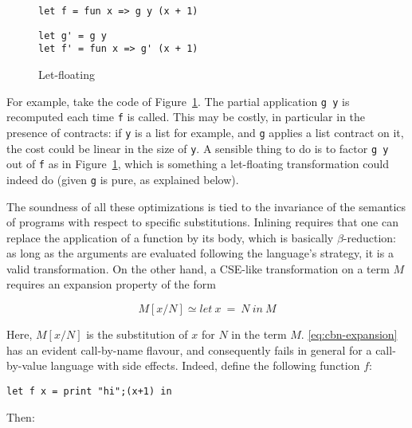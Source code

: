 \documentclass[sigplan,10pt,review,anonymous]{acmart}
\begin{document}
\begin{figure}
  \begin{center}
\begin{lstlisting}[language=nickel,title={Source program}]
let f = fun x => g y (x + 1)
\end{lstlisting}
\begin{lstlisting}[language=nickel,title={Optimized program}]
let g' = g y
let f' = fun x => g' (x + 1)
\end{lstlisting}
  \end{center}
\caption{Let-floating}
\label{fig:optimizations-let-floating-ex}
\end{figure}

For example, take the code of Figure~\ref{fig:optimizations-let-floating-ex}.
The partial application \lstinline+g y+ is recomputed each time \lstinline+f+ is
called. This may be costly, in particular in the presence of contracts: if
\lstinline+y+ is a list for example, and \lstinline+g+ applies a list contract
on it, the cost could be linear in the size of \lstinline+y+. A sensible thing
to do is to factor \lstinline+g y+ out of \lstinline+f+ as in
Figure~\ref{fig:optimizations-let-floating-ex}, which is something a
let-floating transformation could indeed do (given \lstinline+g+ is pure, as
explained below).

The soundness of all these optimizations is tied to the invariance of the
semantics of programs with respect to specific substitutions. Inlining requires
that one can replace the application of a function by its body, which is
basically $\beta$-reduction: as long as the arguments are evaluated following
the language's strategy, it is a valid transformation. On the other hand,
a CSE-like transformation on a term $M$ requires an expansion property of the form

\begin{equation}\label{eq:cbn-expansion}
M[x/N] \simeq let~x~=~N~in~M
\end{equation}

Here, $M[x/N]$ is the substitution of $x$ for $N$ in the term $M$.
\ref{eq:cbn-expansion} has an evident call-by-name flavour, and consequently
fails in general for a call-by-value language with side effects.  Indeed, define
the following function $f$:

\begin{lstlisting}[language=Nickel]
let f x = print "hi";(x+1) in
\end{lstlisting}

Then:
\end{document}

